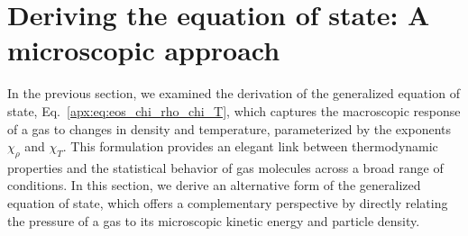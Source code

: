 \documentclass[main.tex]{subfiles}
\begin{document}
\section{Deriving the equation of state: A microscopic approach}
In the previous section, we examined the derivation of the generalized equation of state, Eq.~\eqref{apx:eq:eos_chi_rho_chi_T}, which captures the macroscopic response of a gas to changes in density and temperature, parameterized by the exponents $\chi_\rho$ and $\chi_T$.
This formulation provides an elegant link between thermodynamic properties and the statistical behavior of gas molecules across a broad range of conditions.
In this section, we derive an alternative form of the generalized equation of state, which offers a complementary perspective by directly relating the pressure of a gas to its microscopic kinetic energy and particle density.
\end{document}
